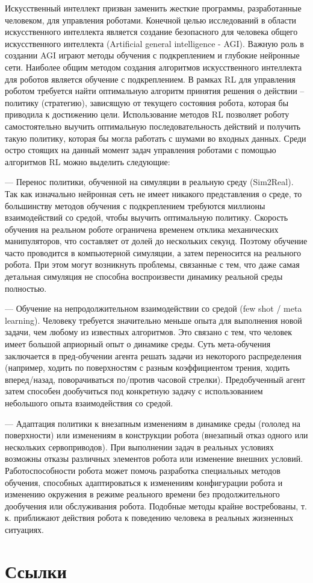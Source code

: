 Искусственный интеллект призван заменить жесткие программы, разработанные человеком, для управления роботами. Конечной целью исследований в области искусственного интеллекта является создание безопасного для человека общего искусственного интеллекта (Artificial general intelligence - AGI). Важную роль в создании AGI играют методы обучения с подкреплением и глубокие нейронные сети. 
Наиболее общим методом создания алгоритмов искусственного интеллекта для роботов является обучение с подкреплением. В рамках RL для управления роботом требуется найти оптимальную алгоритм принятия решения о действии – политику (стратегию), зависящую от текущего состояния робота, которая бы приводила к достижению цели. Использование методов RL позволяет роботу самостоятельно выучить оптимальную последовательность действий и получить такую политику, которая бы могла работать с шумами во входных данных. Среди остро стоящих на данный момент задач управления роботами с помощью алгоритмов RL можно выделить следующие:

--- Перенос политики, обученной на симуляции в реальную среду (Sim2Real). Так как изначально нейронная сеть не имеет никакого представления о среде, то большинству методов обучения с подкреплением требуются миллионы взаимодействий со средой, чтобы выучить оптимальную политику. Скорость обучения на реальном роботе ограничена временем отклика механических манипуляторов, что составляет от долей до нескольких секунд. Поэтому обучение часто проводится в компьютерной симуляции, а затем переносится на реального робота. При этом могут возникнуть проблемы, связанные с тем, что даже самая детальная симуляция не способна воспроизвести динамику реальной среды полностью. 

--- Обучение на непродолжительном взаимодействии со средой (few shot / meta learning). Человеку требуется значительно меньше опыта для выполнения новой задачи, чем любому из известных алгоритмов. Это связано с тем, что человек имеет большой априорный опыт о динамике среды. Суть мета-обучения заключается в пред-обучении агента решать задачи из некоторого распределения (например, ходить по поверхностям с разным коэффициентом трения, ходить вперед/назад, поворачиваться по/против часовой стрелки). Предобученный агент затем способен дообучиться под конкретную задачу с использованием небольшого опыта взаимодействия со средой. 

--- Адаптация политики к внезапным изменениям в динамике среды (гололед на поверхности) или изменениям в конструкции робота (внезапный отказ одного или нескольких сервоприводов). При выполнении задач в реальных условиях возможны отказы различных элементов робота или изменение внешних условий. Работоспособности робота может помочь разработка специальных методов обучения, способных адаптироваться к изменениям конфигурации робота и изменению окружения в режиме реального времени без продолжительного дообучения или обслуживания робота. Подобные методы крайне востребованы, т. к. приближают действия робота к поведению человека в реальных жизненных ситуациях.

\section{Ссылки}\label{sec:ch1/sec2}


\FloatBarrier
